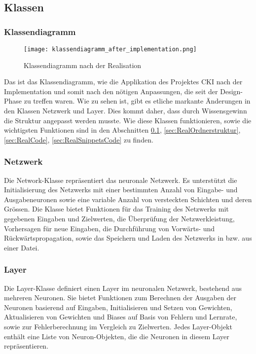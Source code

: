 \subsection{Klassen}
\label{sec:RealKlassen}
\subsubsection{Klassendiagramm}
\label{sec:RealKlassendiagramm}
\begin{figure}[H]
	\centering
		\texttt{[image: klassendiagramm\_after\_implementation.png]}
		\caption{Klassendiagramm nach der Realisation}
	\label{fig:klassendiagramm after implementation}
\end{figure}
Das ist das Klassendiagramm, wie die Applikation des Projektes CKI nach der Implementation und somit nach den nötigen Anpassungen, die seit der Design-Phase zu treffen waren. Wie zu sehen ist, gibt es etliche markante Änderungen in den Klassen Netzwerk und Layer. Dies kommt daher, dass durch Wissensgewinn die Struktur angepasst werden musste. Wie diese Klassen funktionieren, sowie die wichtigsten Funktionen sind in den Abschnitten \ref{sec:RealKlassen}, \ref{sec:RealOrdnerstruktur}, \ref{sec:RealCode}, \ref{sec:RealSnippetsCode} zu finden.

\subsubsection{Netzwerk}
\label{sec:RealNetzwerk}
Die Network-Klasse repräsentiert das neuronale Netzwerk. Es unterstützt die Initialisierung des Netzwerks mit einer bestimmten Anzahl von Eingabe- und Ausgabeneuronen sowie eine variable Anzahl von versteckten Schichten und deren Grössen. Die Klasse bietet Funktionen für das Training des Netzwerks mit gegebenen Eingaben und Zielwerten, die Überprüfung der Netzwerkleistung, Vorhersagen für neue Eingaben, die Durchführung von Vorwärts- und Rückwärtspropagation, sowie das Speichern und Laden des Netzwerks in bzw. aus einer Datei. 
\subsubsection{Layer}
\label{sec:RealLayer}
Die Layer-Klasse definiert einen Layer im neuronalen Netzwerk, bestehend aus mehreren Neuronen. Sie bietet Funktionen zum Berechnen der Ausgaben der Neuronen basierend auf Eingaben, Initialisieren und Setzen von Gewichten, Aktualisieren von Gewichten und Biases auf Basis von Fehlern und Lernrate, sowie zur Fehlerberechnung im Vergleich zu Zielwerten. Jedes Layer-Objekt enthält eine Liste von Neuron-Objekten, die die Neuronen in diesem Layer repräsentieren. 

